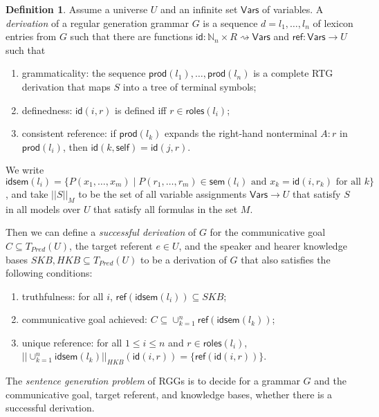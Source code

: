\documentclass[11pt,a4]{article}
\def\N{\mathbb{N}}
\newcommand{\sem}{\mathsf{sem}}
\newcommand{\self}{\mathsf{self}}
\newcommand{\produ}{\mathsf{prod}}
\newcommand{\roles}{\mathsf{roles}}
\newcommand{\refr}{\mathsf{ref}}
\newcommand{\id}{\mathsf{id}}
\newcommand{\idsem}{\mathsf{idsem}}
\newcommand{\Vars}{\mathsf{Vars}}
\theoremstyle{plain}
\theoremstyle{definition}
\newtheorem{definition}[theorem]{Definition}
\begin{document}
\begin{definition}
  Assume a universe $U$ and an infinite set $\Vars$ of variables. A
  \emph{derivation} of a regular generation grammar $G$ is a sequence
  $d = l_1,\ldots,l_n$ of lexicon entries from $G$ such that there are
  functions $\id:\N_n \times R \rightsquigarrow \Vars$ and
  $\refr:\Vars \rightarrow U$ such that
  \begin{enumerate}
  \item grammaticality: the sequence $\produ(l_1),\ldots,\produ(l_n)$
    is a complete RTG derivation that maps $S$ into a tree of terminal
    symbols;
  \item definedness: $\id(i,r)$ is defined iff $r \in
    \roles(l_i)$;
  \item consistent reference: if $\produ(l_k)$ expands the right-hand
    nonterminal $A:r$ in $\produ(l_i)$, then $\id(k,\self) =
    \id(j,r)$.
  \end{enumerate}

  We write $\idsem(l_i) = \{P(x_1,\ldots,x_m) \;|\;
  \mbox{$P(r_1,\ldots,r_m) \in \sem(l_i)$ and $x_k = \id(i,r_k)$ for
    all $k$}\}$, and take $||S||_M$ to be the set of all variable
  assignments $\Vars \rightarrow U$ that satisfy $S$ in all models
  over $U$ that satisfy all formulas in the set $M$.

  Then we can define a \emph{successful derivation} of $G$ for the
  communicative goal $C \subseteq T_{Pred}(U)$, the target referent $e
  \in U$, and the speaker and hearer knowledge bases $SKB, HKB
  \subseteq T_{Pred}(U)$ to be a derivation of $G$ that also satisfies
  the following conditions:

  \begin{enumerate}
  \item truthfulness: for all $i$, $\refr(\idsem(l_i)) \subseteq SKB$;
  \item communicative goal achieved: $C \subseteq \cup_{k=1}^n \refr(\idsem(l_k))$;
  \item unique reference: for all $1 \leq i \leq n$ and $r \in
    \roles(l_i)$, $|| \cup_{k=1}^n \idsem(l_k) ||_{HKB}(\id(i,r)) =
    \{\refr(\id(i,r))\}$.
  \end{enumerate}

  The \emph{sentence generation problem} of RGGs is to decide for a
  grammar $G$ and the communicative goal, target referent, and
  knowledge bases, whether there is a successful derivation.
\end{definition}
\end{document}
